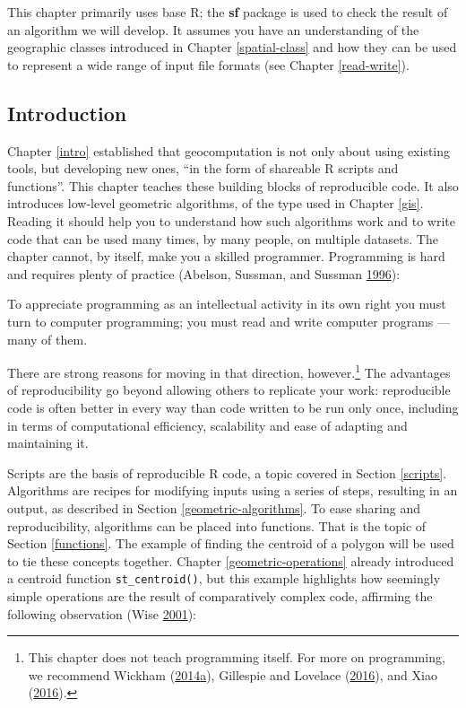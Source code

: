 \documentclass[]{krantz}
\let\rmarkdownfootnote\footnote%
\def\footnote{\protect\rmarkdownfootnote}
\renewenvironment{quote}{\begin{VF}}{\end{VF}}
\begin{document}
This chapter primarily uses base R; the \textbf{sf} package is used to check the result of an algorithm we will develop.
It assumes you have an understanding of the geographic classes introduced in Chapter \ref{spatial-class} and how they can be used to represent a wide range of input file formats (see Chapter \ref{read-write}).

\hypertarget{intro-algorithms}{%
\subsection{Introduction}\label{intro-algorithms}}

Chapter \ref{intro} established that geocomputation is not only about using existing tools, but developing new ones, ``in the form of shareable R scripts and functions''.
This chapter teaches these building blocks of reproducible code.
It also introduces low-level geometric algorithms, of the type used in Chapter \ref{gis}.
Reading it should help you to understand how such algorithms work and to write code that can be used many times, by many people, on multiple datasets.
The chapter cannot, by itself, make you a skilled programmer.
Programming is hard and requires plenty of practice (Abelson, Sussman, and Sussman \protect\hyperlink{ref-abelson_structure_1996}{1996}):

\begin{quote}
To appreciate programming as an intellectual activity in its own right you must turn to computer programming; you must read and write computer programs --- many of them.
\end{quote}

There are strong reasons for moving in that direction, however.\footnote{This chapter does not teach programming itself.
  For more on programming, we recommend Wickham (\protect\hyperlink{ref-wickham_advanced_2014}{2014}\protect\hyperlink{ref-wickham_advanced_2014}{a}), Gillespie and Lovelace (\protect\hyperlink{ref-gillespie_efficient_2016}{2016}), and Xiao (\protect\hyperlink{ref-xiao_gis_2016}{2016}). }
The advantages of reproducibility go beyond allowing others to replicate your work:
reproducible code is often better in every way than code written to be run only once, including in terms of computational efficiency, scalability and ease of adapting and maintaining it.

Scripts are the basis of reproducible R code, a topic covered in Section \ref{scripts}.
Algorithms are recipes for modifying inputs using a series of steps, resulting in an output, as described in Section \ref{geometric-algorithms}.
To ease sharing and reproducibility, algorithms can be placed into functions.
That is the topic of Section \ref{functions}.
The example of finding the centroid of a polygon will be used to tie these concepts together.
Chapter \ref{geometric-operations} already introduced a centroid function \texttt{st\_centroid()}, but this example highlights how seemingly simple operations are the result of comparatively complex code, affirming the following observation (Wise \protect\hyperlink{ref-wise_gis_2001}{2001}):
\end{document}
